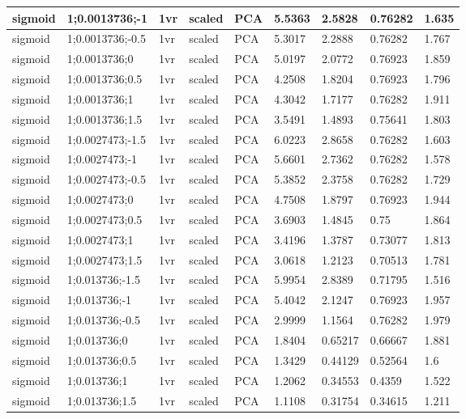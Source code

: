 \begin{longtable}{lllllllll}
sigmoid & 1;0.0013736;-1 & 1vr & scaled & PCA & 5.5363 & 2.5828 & 0.76282 & 1.635\\ \hline
sigmoid & 1;0.0013736;-0.5 & 1vr & scaled & PCA & 5.3017 & 2.2888 & 0.76282 & 1.767\\ \hline
sigmoid & 1;0.0013736;0 & 1vr & scaled & PCA & 5.0197 & 2.0772 & 0.76923 & 1.859\\ \hline
sigmoid & 1;0.0013736;0.5 & 1vr & scaled & PCA & 4.2508 & 1.8204 & 0.76923 & 1.796\\ \hline
sigmoid & 1;0.0013736;1 & 1vr & scaled & PCA & 4.3042 & 1.7177 & 0.76282 & 1.911\\ \hline
sigmoid & 1;0.0013736;1.5 & 1vr & scaled & PCA & 3.5491 & 1.4893 & 0.75641 & 1.803\\ \hline
sigmoid & 1;0.0027473;-1.5 & 1vr & scaled & PCA & 6.0223 & 2.8658 & 0.76282 & 1.603\\ \hline
sigmoid & 1;0.0027473;-1 & 1vr & scaled & PCA & 5.6601 & 2.7362 & 0.76282 & 1.578\\ \hline
sigmoid & 1;0.0027473;-0.5 & 1vr & scaled & PCA & 5.3852 & 2.3758 & 0.76282 & 1.729\\ \hline
sigmoid & 1;0.0027473;0 & 1vr & scaled & PCA & 4.7508 & 1.8797 & 0.76923 & 1.944\\ \hline
sigmoid & 1;0.0027473;0.5 & 1vr & scaled & PCA & 3.6903 & 1.4845 & 0.75 & 1.864\\ \hline
sigmoid & 1;0.0027473;1 & 1vr & scaled & PCA & 3.4196 & 1.3787 & 0.73077 & 1.813\\ \hline
sigmoid & 1;0.0027473;1.5 & 1vr & scaled & PCA & 3.0618 & 1.2123 & 0.70513 & 1.781\\ \hline
sigmoid & 1;0.013736;-1.5 & 1vr & scaled & PCA & 5.9954 & 2.8389 & 0.71795 & 1.516\\ \hline
sigmoid & 1;0.013736;-1 & 1vr & scaled & PCA & 5.4042 & 2.1247 & 0.76923 & 1.957\\ \hline
sigmoid & 1;0.013736;-0.5 & 1vr & scaled & PCA & 2.9999 & 1.1564 & 0.76282 & 1.979\\ \hline
sigmoid & 1;0.013736;0 & 1vr & scaled & PCA & 1.8404 & 0.65217 & 0.66667 & 1.881\\ \hline
sigmoid & 1;0.013736;0.5 & 1vr & scaled & PCA & 1.3429 & 0.44129 & 0.52564 & 1.6\\ \hline
sigmoid & 1;0.013736;1 & 1vr & scaled & PCA & 1.2062 & 0.34553 & 0.4359 & 1.522\\ \hline
sigmoid & 1;0.013736;1.5 & 1vr & scaled & PCA & 1.1108 & 0.31754 & 0.34615 & 1.211\\ \hline

\end{longtable}
